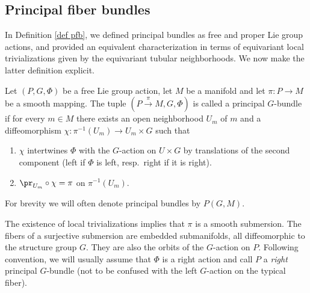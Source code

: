 \subsection{Principal fiber bundles}\label{sec: principal bundles}


In Definition \ref{def pfb}, we defined principal bundles as free and proper Lie group actions, and provided an equivalent characterization in terms of equivariant local trivializations given by the equivariant tubular neighborhoods. We now make the latter definition explicit.

\begin{defn}\label{def pfb 2}
    Let $(P,G,\Phi)$ be a free Lie group action, let $M$ be a manifold and let $\pi:P\to M$ be a smooth mapping. The tuple $(P\overset{\pi}{\to}M,G,\Phi)$ is called a principal $G$-bundle if for every $m\in M$ there exists an open neighborhood $U_m$ of $m$ and a diffeomorphism $\chi:\pi^{-1}(U_m)\to U_m\times G$ such that
    \begin{enumerate}
        \item $\chi$ intertwines $\Phi$ with the $G$-action on $U\times G$ by translations of the second component (left if $\Phi$ is left, resp.\ right if it is right).
        \item $\pr_{U_m}\circ \chi=\pi$ on $\pi^{-1}(U_m)$.
    \end{enumerate}
    For brevity we will often denote principal bundles by $P(G,M)$.
\end{defn}

The existence of local trivializations implies that $\pi$ is a smooth submersion. The fibers of a surjective submersion are embedded submanifolds, all diffeomorphic to the structure group $G$. They are also the orbits of the $G$-action on $P$. Following convention, we will usually assume that $\Phi$ is a right action and call $P$ a \emph{right} principal $G$-bundle (not to be confused with the left $G$-action on the typical fiber).


